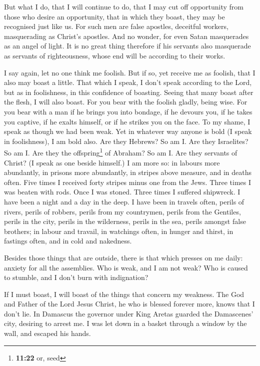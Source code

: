  But what I do, that I will continue to do, that I may
cut off opportunity from those who desire an opportunity, that in which
they boast, they may be recognised just like us.  For
such men are false apostles, deceitful workers, masquerading as Christ's
apostles.  And no wonder, for even Satan masquerades as
an angel of light.  It is no great thing therefore if his
servants also masquerade as servants of righteousness, whose end will be
according to their works.

 I say again, let no one think me foolish. But if so, yet
receive me as foolish, that I also may boast a little. 
That which I speak, I don't speak according to the Lord, but as in
foolishness, in this confidence of boasting.  Seeing that
many boast after the flesh, I will also boast.  For you
bear with the foolish gladly, being wise.  For you bear
with a man if he brings you into bondage, if he devours you, if he takes
you captive, if he exalts himself, or if he strikes you on the face.
 To my shame, I speak as though we had been weak. Yet in
whatever way anyone is bold (I speak in foolishness), I am bold also.
 Are they Hebrews? So am I. Are they Israelites? So am I.
Are they the offspring\footnote{\textbf{11:22} or, seed} of Abraham? So
am I.  Are they servants of Christ? (I speak as one
beside himself.) I am more so: in labours more abundantly, in prisons
more abundantly, in stripes above measure, and in deaths often.
 Five times I received forty stripes minus one from the
Jews.  Three times I was beaten with rods. Once I was
stoned. Three times I suffered shipwreck. I have been a night and a day
in the deep.  I have been in travels often, perils of
rivers, perils of robbers, perils from my countrymen, perils from the
Gentiles, perils in the city, perils in the wilderness, perils in the
sea, perils amongst false brothers;  in labour and
travail, in watchings often, in hunger and thirst, in fastings often,
and in cold and nakedness.

 Besides those things that are outside, there is that
which presses on me daily: anxiety for all the assemblies.
 Who is weak, and I am not weak? Who is caused to
stumble, and I don't burn with indignation?

 If I must boast, I will boast of the things that concern
my weakness.  The God and Father of the Lord Jesus
Christ, he who is blessed forever more, knows that I don't lie.
 In Damascus the governor under King Aretas guarded the
Damascenes' city, desiring to arrest me.  I was let down
in a basket through a window by the wall, and escaped his hands.

